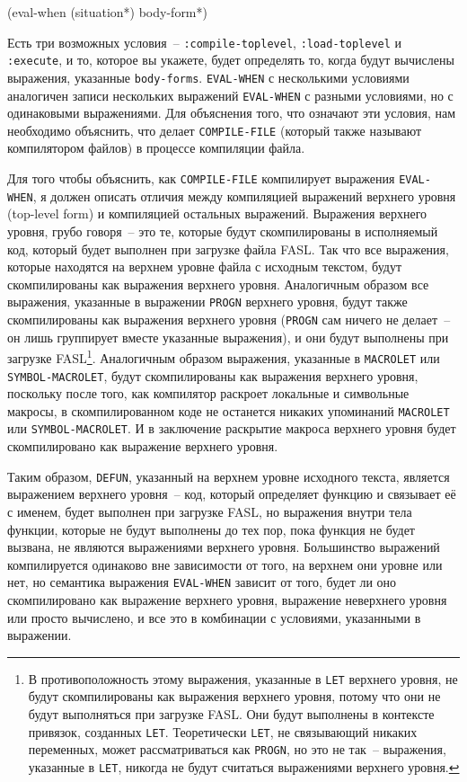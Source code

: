 \begin{myverb}
(eval-when (situation*)
  body-form*)
\end{myverb}

Есть три возможных условия~-- \lstinline{:compile-toplevel}, \lstinline{:load-toplevel}
и \lstinline{:execute}, и то, которое вы укажете, будет определять то, когда будут вычислены
выражения, указанные \lstinline{body-forms}.  \lstinline{EVAL-WHEN} с несколькими условиями
аналогичен записи нескольких выражений \lstinline{EVAL-WHEN} с разными условиями, но с
одинаковыми выражениями.  Для объяснения того, что означают эти условия, нам необходимо
объяснить, что делает \lstinline{COMPILE-FILE} (который также называют компилятором файлов) в
процессе компиляции файла.

Для того чтобы объяснить, как \lstinline{COMPILE-FILE} компилирует выражения
\lstinline{EVAL-WHEN}, я должен описать отличия между компиляцией выражений верхнего
уровня (top-level form) и компиляцией остальных выражений.  Выражения верхнего уровня,
грубо говоря~-- это те, которые будут скомпилированы в исполняемый код, который будет
выполнен при загрузке файла FASL.  Так что все выражения, которые находятся на верхнем
уровне файла с исходным текстом, будут скомпилированы как выражения верхнего
уровня. Аналогичным образом все выражения, указанные в выражении \lstinline{PROGN}
верхнего уровня, будут также скомпилированы как выражения верхнего уровня
(\lstinline{PROGN} сам ничего не делает~-- он лишь группирует вместе указанные выражения),
и они будут выполнены при загрузке FASL\footnote{В противоположность этому выражения,
  указанные в \lstinline{LET} верхнего уровня, не будут скомпилированы как выражения
  верхнего уровня, потому что они не будут выполняться при загрузке FASL.  Они будут
  выполнены в контексте привязок, созданных \lstinline{LET}. Теоретически \lstinline{LET},
  не связывающий никаких переменных, может рассматриваться как \lstinline{PROGN}, но это не
  так~-- выражения, указанные в \lstinline{LET}, никогда не будут считаться выражениями
  верхнего уровня.}.  Аналогичным образом выражения, указанные в \lstinline{MACROLET} или
\lstinline{SYMBOL-MACROLET}, будут скомпилированы как выражения верхнего уровня, поскольку
после того, как компилятор раскроет локальные и символьные макросы, в скомпилированном
коде не останется никаких упоминаний \lstinline{MACROLET} или \lstinline{SYMBOL-MACROLET}.
И в заключение раскрытие макроса верхнего уровня будет скомпилировано как выражение
верхнего уровня.

Таким образом, \lstinline{DEFUN}, указанный на верхнем уровне исходного текста, является
выражением верхнего уровня~-- код, который определяет функцию и связывает её с именем,
будет выполнен при загрузке FASL, но выражения внутри тела функции, которые не будут
выполнены до тех пор, пока функция не будет вызвана, не являются выражениями верхнего
уровня.  Большинство выражений компилируется одинаково вне зависимости от того, на верхнем
они уровне или нет, но семантика выражения \lstinline{EVAL-WHEN} зависит от того, будет ли
оно скомпилировано как выражение верхнего уровня, выражение неверхнего уровня или просто
вычислено, и все это в комбинации с условиями, указанными в выражении.

